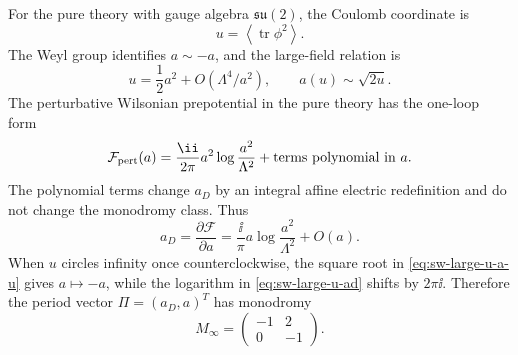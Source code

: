 For the pure theory with gauge algebra \(\mathfrak{su}(2)\), the Coulomb
coordinate is
\[
  u=\left\langle \operatorname{tr}\phi^2\right\rangle .
\]
The Weyl group identifies \(a\sim -a\), and the large-field relation is
\begin{equation}
  u=\frac12a^2+O(\Lambda^4/a^2),
  \qquad
  a(u)\sim\sqrt{2u}.
  \label{eq:sw-large-u-a-u}
\end{equation}
The perturbative Wilsonian prepotential in the pure theory has the one-loop
form
\begin{equation}
  \mathcal F_{\rm pert}(a)
  =
  \frac{\ii}{2\pi}a^2
  \log\frac{a^2}{\Lambda^2}
  +
  \hbox{terms polynomial in }a .
  \label{eq:sw-perturbative-prepotential}
\end{equation}
The polynomial terms change \(a_D\) by an integral affine electric
redefinition and do not change the monodromy class.  Thus
\begin{equation}
  a_D=\frac{\partial\mathcal F}{\partial a}
  =
  \frac{\ii}{\pi}a
  \log\frac{a^2}{\Lambda^2}
  +O(a).
  \label{eq:sw-large-u-ad}
\end{equation}
When \(u\) circles infinity once counterclockwise, the square root in
\eqref{eq:sw-large-u-a-u} gives \(a\mapsto -a\), while the logarithm in
\eqref{eq:sw-large-u-ad} shifts by \(2\pi\ii\).  Therefore the period vector
\(\Pi=(a_D,a)^T\) has monodromy
\begin{equation}
  M_\infty
  =
  \begin{pmatrix}
  -1&2\\
  0&-1
  \end{pmatrix}.
  \label{eq:sw-infinity-monodromy-derived}
\end{equation}

